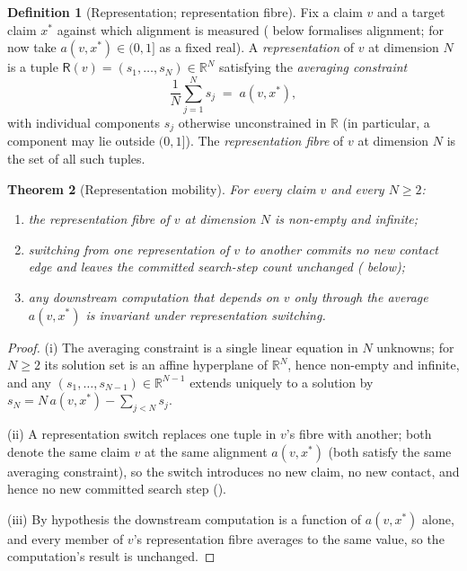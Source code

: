 \documentclass[11pt,twocolumn,a4paper]{article}
\theoremstyle{thmstyle}
\newtheorem{theorem}{Theorem}[section]
\theoremstyle{definition}
\newtheorem{definition}[theorem]{Definition}
\theoremstyle{remark}
\newcommand{\R}{\mathbb{R}}
\newcommand{\Rep}{\mathsf{R}}
\begin{document}
\begin{definition}[Representation; representation fibre]
\label{def:representation}
Fix a claim $v$ and a target claim $x^{\ast}$ against which alignment is
measured ( below formalises alignment; for now take
$a(v,x^{\ast})\in(0,1]$ as a fixed real). A \emph{representation} of $v$ at
dimension $N$ is a tuple $\Rep(v)=(s_1,\dots,s_N)\in\R^{N}$ satisfying the
\emph{averaging constraint}
\[
\frac{1}{N}\sum_{j=1}^{N} s_j \;=\; a(v,x^{\ast}),
\]
with individual components $s_j$ otherwise unconstrained in $\R$ (in
particular, a component may lie outside $(0,1]$). The \emph{representation
fibre} of $v$ at dimension $N$ is the set of all such tuples.
\end{definition}

\begin{theorem}[Representation mobility]
\label{thm:rep-mobility}
For every claim $v$ and every $N\ge2$:
\begin{enumerate}[label=\textup{(\roman*)},leftmargin=2.2em]
\item the representation fibre of $v$ at dimension $N$ is non-empty and
infinite;
\item switching from one representation of $v$ to another commits no new
contact edge and leaves the committed search-step count unchanged
( below);
\item any downstream computation that depends on $v$ only through the
average $a(v,x^{\ast})$ is invariant under representation switching.
\end{enumerate}
\end{theorem}

\begin{proof}
(i) The averaging constraint is a single linear equation in $N$ unknowns;
for $N\ge2$ its solution set is an affine hyperplane of $\R^{N}$, hence
non-empty and infinite, and any $(s_1,\dots,s_{N-1})\in\R^{N-1}$ extends
uniquely to a solution by $s_N=N\,a(v,x^{\ast})-\sum_{j<N}s_j$.

(ii) A representation switch replaces one tuple in $v$'s fibre with
another; both denote the same claim $v$ at the same alignment
$a(v,x^{\ast})$ (both satisfy the same averaging constraint), so the switch
introduces no new claim, no new contact, and hence no new committed search
step ().

(iii) By hypothesis the downstream computation is a function of
$a(v,x^{\ast})$ alone, and every member of $v$'s representation fibre
averages to the same value, so the computation's result is unchanged.
\end{proof}
\end{document}
